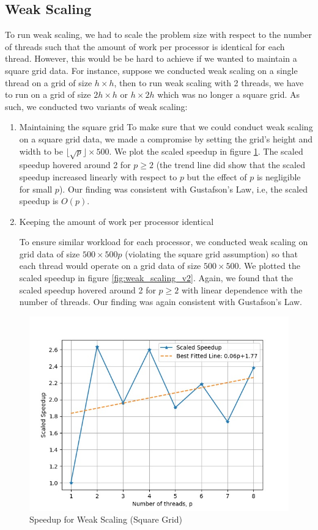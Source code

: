 \documentclass{article}
\begin{document}
\subsection{Weak Scaling}
To run weak scaling, we had to scale the problem size with respect to the number of threads such that the amount of work per processor is identical for each thread.
However, this would be be hard to achieve if we wanted to maintain a square grid data.
For instance, suppose we conducted weak scaling on a single thread on a grid of size $h \times h$, then to run weak scaling with 2 threads,
we have to run on a grid of size $2h \times h$ or $h \times 2h$ which was no longer a square grid. As such, we conducted two variants of weak scaling:

\begin{enumerate}
    \item Maintaining the square grid
    \newline
    To make sure that we could conduct weak scaling on a square grid data, we made a compromise by setting the grid’s height and width to be $\lfloor \sqrt{p} \rfloor \times 500$.
    We plot the scaled speedup in figure \ref{fig:weak_scaling}. The scaled speedup hovered around 2 for $p \ge 2$ (the trend line did show that the scaled speedup increased linearly with respect to $p$ but the effect of $p$ is negligible for small $p$).
    Our finding was consistent with Gustafson’s Law, i.e, the scaled speedup is $O(p)$.

    \item Keeping the amount of work per processor identical

    To ensure similar workload for each processor, we conducted weak scaling on grid data of size $500 \times 500p$ (violating the square grid assumption) so that each thread would operate on a grid data of size $500 \times 500$.
    We plotted the scaled speedup in figure \ref{fig:weak_scaling_v2}. Again, we found that the scaled speedup hovered around 2 for $p \ge 2$ with linear dependence with the number of threads.
    Our finding was again consistent with Gustafson’s Law.
\end{enumerate}
\begin{figure}[h!]
	\centering
	\includegraphics[width=0.8\columnwidth]{../weak_scaling.jpg}
	\caption{Speedup for Weak Scaling (Square Grid)}
	\label{fig:weak_scaling}
\end{figure}
\end{document}
